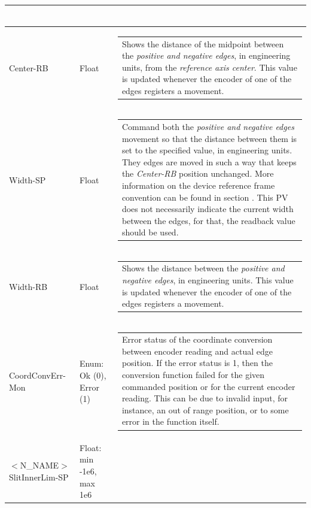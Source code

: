 \documentclass[openany]{article}
\begin{document}
\begin{longtable}{| m{4.5cm} m{2.5cm}  m{7.0cm} |}
\begin{tabular}{@{}m{6cm}@{}}
            \end{tabular} \hypertarget{}{}\\ \hline
        Center-RB & Float & \begin{tabular}{@{}m{6cm}@{}}
                Shows the distance of the midpoint between the \emph{positive and negative edges}, in engineering units, from the \emph{reference axis center}. This value is updated whenever the encoder of one of the edges registers a movement.
            \end{tabular} \hypertarget{pv:width}{}\\ \hline
        Width-SP & Float & \begin{tabular}{@{}m{6cm}@{}}
                Command both the \emph{positive and negative edges} movement so that the distance between them is set to the specified value, in engineering units. They edges are moved in such a way that keeps the \emph{Center-RB} position unchanged. More information on the device reference frame convention can be found in section \nameref{sec:dev-reference-frame}. This PV does not necessarily indicate the current width between the edges, for that, the readback value should be used.
            \end{tabular} \hypertarget{}{}\\ \hline
        Width-RB & Float & \begin{tabular}{@{}m{6cm}@{}}
                Shows the distance between the \emph{positive and negative edges}, in engineering units. This value is updated whenever the encoder of one of the edges registers a movement.
            \end{tabular} \hypertarget{pv:coord-conv-err-mon}{}\\ \hline
        CoordConvErr-Mon & Enum: Ok (0), Error (1) & \begin{tabular}{@{}m{6cm}@{}}
                Error status of the coordinate conversion between encoder reading and actual edge position. If the error status is 1, then the conversion function failed for the given commanded position or for the current encoder reading. This can be due to invalid input, for instance, an out of range position, or to some error in the function itself.
            \end{tabular} \hypertarget{pv:neg-edge-inner-lim}{}\\ \hline
	$<$N\_NAME$>$SlitInnerLim-SP & Float: min -1e6, max 1e6 & \begin{tabular}{@{}m{6cm}@{}}

\end{tabular}
\end{longtable}
\end{document}
